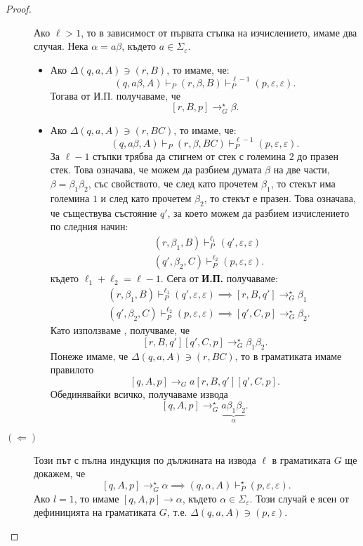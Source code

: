 \begin{proof}
\begin{description}
    Ако $\ell > 1$, то в зависимост от първата стъпка на изчислението, имаме два случая.
    Нека $\alpha = a\beta$, където $a \in \Sigma_\varepsilon$.
    \begin{itemize}
    \item 
      Ако $\Delta(q,a,A) \ni (r,B)$, то имаме, че:
      \[(q,a\beta,A) \vdash_P (r,\beta,B) \vdash^{\ell-1}_P (p, \varepsilon, \varepsilon).\]
      Тогава от И.П. получаваме, че
      \[[r,B,p] \to^\star_G \beta.\]
    \item
      Ако $\Delta(q, a, A) \ni (r, BC)$, то имаме, че:
      \[(q, a\beta, A) \vdash_P (r, \beta, BC) \vdash^{\ell-1}_P (p, \varepsilon, \varepsilon).\]      
      За $\ell-1$ стъпки трябва да стигнем от стек с големина $2$ до празен стек.
      Това означава, че можем да разбием думата $\beta$ на две части, $\beta = \beta_1\beta_2$, със свойството, че след като прочетем $\beta_1$,
      то стекът има големина $1$ и след като прочетем $\beta_2$, то стекът е празен.
      Това означава, че съществува състояние $q'$, за което можем да разбием изчислението по следния начин:
      \begin{align*}
        & (r, \beta_1, B) \vdash^{\ell_1}_P (q',\varepsilon,\varepsilon)\\
        & (q', \beta_2, C) \vdash^{\ell_2}_P (p,\varepsilon,\varepsilon).
      \end{align*}
      където $\ell_1 + \ell_2 = \ell - 1$.    
      Сега от {\bf И.П.} получаваме:
      \begin{align*}
        & (r, \beta_1, B) \vdash^{\ell_1}_P (q', \varepsilon, \varepsilon) \implies [r, B, q'] \to^\star_G \beta_1\\
        & (q', \beta_2, C) \vdash^{\ell_2}_P (p, \varepsilon, \varepsilon) \implies [q', C, p] \to^\star_G \beta_2.
      \end{align*}
      Като използваме , получваме, че
      \[[r,B,q'][q',C,p] \to^\star_G \beta_1\beta_2.\]
      Понеже имаме, че $\Delta(q,a,A) \ni (r,BC)$, то в граматиката имаме правилото
      \[[q,A,p] \rightarrow_G a[r,B,q'][q',C,p].\]
      Обединявайки всичко, получаваме извода
      \[[q,A,p] \rightarrow^\star_G \underbrace{a\beta_1\beta_2}_{\alpha}.\]
    \end{itemize}
  \item[$(\Leftarrow)$]
    Този път с пълна индукция по дължината на извода $\ell$ в граматиката $G$ ще докажем, че
    \[[q,A,p] \rightarrow^\star_G \alpha \implies (q,\alpha,A) \vdash^\star_P (p,\varepsilon,\varepsilon).\]
    Ако $l = 1$, то имаме $[q,A,p] \rightarrow \alpha$, където $\alpha \in \Sigma_\varepsilon$.
    Този случай е ясен от дефиницията на граматиката $G$, т.е. $\Delta(q,a,A) \ni (p,\varepsilon)$.


\end{description}
\end{proof}
